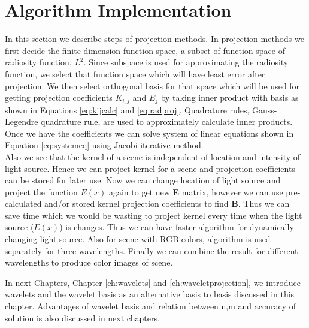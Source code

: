 \section{Algorithm Implementation}
In this section we describe steps of projection methods. In projection methods we first decide the finite dimension function space, a subset of function space of radiosity function, $L^2$. Since subspace is used for approximating the radiosity function, we select that function space which will have least error after  projection.  We then select orthogonal basis for that space which will be used for getting projection coefficients $K_{i,j}$ and $E_{j}$ by taking inner product with basis as shown in Equations \ref{eq:kijcalc} and \ref{eq:radproj}. Quadrature rules, Gauss-Legendre quadrature rule, are used to approximately calculate inner products. Once we have the coefficients  we can solve system of linear equations shown in Equation \ref{eq:systemeq} using Jacobi iterative method. \\

Also we see that the kernel of a scene is independent of location and intensity of light source. Hence we can project kernel for a scene and projection coefficients can be stored for later use. Now we can change location of light source and project the function $E(x) $ again to get new {\bf E} matrix, however we can use pre-calculated and/or stored kernel projection coefficients to find {\bf B}. Thus we can save time which we would be wasting to project kernel every time when the light source ($E(x)$) is changes. Thus we can have faster algorithm for dynamically changing light source. Also for scene with RGB colors, algorithm is used separately for three wavelengths. Finally we can combine the result for different wavelengths to produce color images of scene.


In next Chapters, Chapter \ref{ch:wavelets} and \ref{ch:waveletprojection}, we introduce wavelets and the wavelet basis as an alternative basis to basis discussed in this chapter. Advantages of wavelet basis and relation between n,m and accuracy of solution is also discussed in next chapters.
    